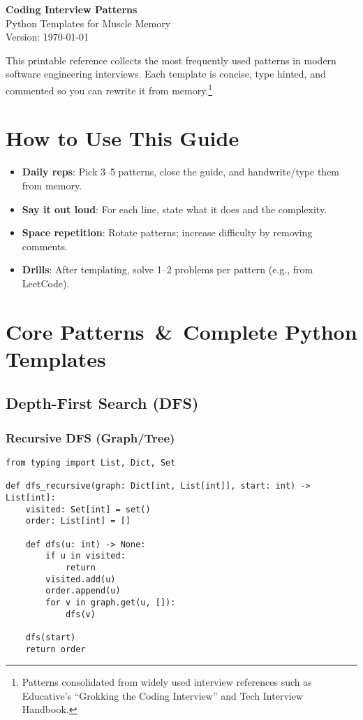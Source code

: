 \documentclass[11pt]{article}
\begin{document}
\begin{center}
{\LARGE \textbf{Coding Interview Patterns}}\\[0.4em]
{\large Python Templates for Muscle Memory}\\[0.4em]
{\normalsize Version: \today}
\end{center}


\vspace{0.5em}
This printable reference collects the most frequently used patterns in modern software engineering interviews. Each template is concise, type hinted, and commented so you can rewrite it from memory.\footnote{Patterns consolidated from widely used interview references such as Educative's ``Grokking the Coding Interview'' and Tech Interview Handbook.}


\tableofcontents
\newpage

\section{How to Use This Guide}
\begin{itemize}[leftmargin=1.2em]
  \item \textbf{Daily reps}: Pick 3--5 patterns, close the guide, and handwrite/type them from memory.
  \item \textbf{Say it out loud}: For each line, state what it does and the complexity.
  \item \textbf{Space repetition}: Rotate patterns; increase difficulty by removing comments.
  \item \textbf{Drills}: After templating, solve 1--2 problems per pattern (e.g., from LeetCode).
\end{itemize}

\section{Core Patterns \,\& \,Complete Python Templates}

\subsection{Depth-First Search (DFS)}
\subsubsection*{Recursive DFS (Graph/Tree)}
\begin{lstlisting}[style=py,caption={Recursive DFS}]
from typing import List, Dict, Set

def dfs_recursive(graph: Dict[int, List[int]], start: int) -> List[int]:
    visited: Set[int] = set()
    order: List[int] = []

    def dfs(u: int) -> None:
        if u in visited:
            return
        visited.add(u)
        order.append(u)
        for v in graph.get(u, []):
            dfs(v)

    dfs(start)
    return order
\end{lstlisting}
\end{document}
